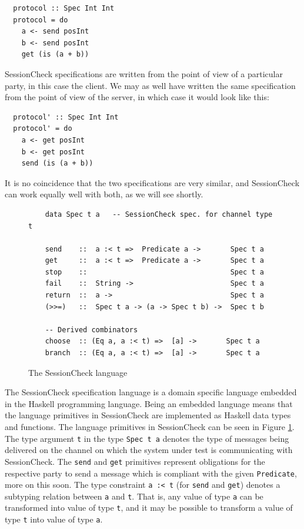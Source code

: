 \documentclass{article}
\begin{document}
\begin{verbatim}
  protocol :: Spec Int Int
  protocol = do
    a <- send posInt
    b <- send posInt
    get (is (a + b))
\end{verbatim}

%
SessionCheck specifications are written from the point of view of a particular party, in this case the client.
%
We may as well have written the same specification from the point of view of the server,
in which case it would look like this:
%

\begin{verbatim}
  protocol' :: Spec Int Int
  protocol' = do
    a <- get posInt
    b <- get posInt
    send (is (a + b))
  \end{verbatim}

%
It is no coincidence that the two specifications are very similar, and SessionCheck can work equally well with
both, as we will see shortly.

\begin{figure}[tbp]
  \begin{verbatim}
    data Spec t a   -- SessionCheck spec. for channel type t

    send    ::  a :< t =>  Predicate a ->       Spec t a
    get     ::  a :< t =>  Predicate a ->       Spec t a
    stop    ::                                  Spec t a
    fail    ::  String ->                       Spec t a
    return  ::  a ->                            Spec t a
    (>>=)   ::  Spec t a -> (a -> Spec t b) ->  Spec t b

    -- Derived combinators
    choose  :: (Eq a, a :< t) =>  [a] ->       Spec t a
    branch  :: (Eq a, a :< t) =>  [a] ->       Spec t a
  \end{verbatim}
  \caption{\label{fig:SessionCheck:language} The SessionCheck language}
\end{figure}
%
The SessionCheck specification language is a domain specific language embedded in the Haskell \cite{Haskell}
programming language.
%
Being an embedded language means that the language primitives in SessionCheck are
implemented as Haskell data types and functions.
%
The language primitives in SessionCheck can be seen in Figure \ref{fig:SessionCheck:language}.
%
The type argument \texttt{t} in the type \texttt{Spec t a} denotes the type of messages
being delivered on the channel on which the system under test is communicating
with SessionCheck.
%
The \texttt{send} and \texttt{get} primitives represent obligations for the respective party to send a message
which is compliant with the given \texttt{Predicate}, more on this soon.
%
The type constraint \texttt{a :< t} (for \texttt{send} and
\texttt{get}) denotes a subtyping relation between \texttt{a} and
\texttt{t}.
%
That is, any value of type \texttt{a} can be transformed into value of type \texttt{t}, and it may be
possible to transform a value of type \texttt{t} into value of type \texttt{a}.
%
\end{document}
